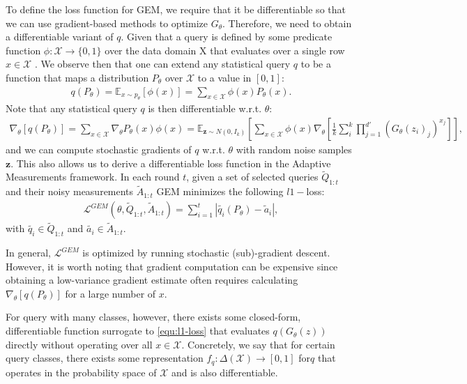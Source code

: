 To define the loss function for GEM, we require that it be differentiable so that we can use gradient-based methods to optimize $G_{\theta}$. Therefore, we need to obtain a differentiable variant of $q$. Given that a query is defined by some predicate function $\phi:\mathcal{X}\rightarrow \{0,1\}$ over the data domain X that evaluates over a single row $x \in \mathcal{X}$ . We observe then that one can extend any statistical query $q$ to be a function that maps a distribution $P_\theta$ over $\mathcal{X}$ to a value in $[0, 1]$:
\begin{align}
    \label{equ:qfunction}
    q(P_{\theta})=\mathbb{E}_{x\sim p_\theta}[\phi(x)]=\sum _{x\in\mathcal{X}}\phi(x)P_\theta(x).
\end{align}
Note that any statistical query $q$ is then differentiable w.r.t. $\theta$:
\begin{align*}
    \nabla_\theta[q(P_\theta)]=\sum_{x\in \mathcal{X}}\nabla_\theta P_\theta(x)\phi(x)=\mathbb{E}_{\textbf{z}\sim N(0,I_k)}\left [ \sum_{x\in \mathcal{X}}\phi(x)\nabla_\theta\left [ \frac{1}{k}\sum_{i}^{k}\prod_{j=1}^{d'}(G_\theta(z_i)_j)^{x_j}  \right ] \right ],
\end{align*}
and we can compute stochastic gradients of $q$ w.r.t. $\theta$ with random noise samples $\textbf{z}$. This also allows us to derive a differentiable loss function in the Adaptive Measurements framework. In each round $t$, given a set of selected queries $\tilde{Q}_{1:t}$ and their noisy measurements $\tilde{A}_{1:t}$ GEM minimizes the following $l1-$loss:
\begin{align}
    \label{equ:l1-loss}
    \mathcal{L}^{GEM}\left ( \theta,\tilde{Q}_{1:t}, \tilde{A}_{1:t}\right )=\sum_{i=1}^{t}\left | \tilde{q_i}(P_\theta)- \tilde{a}_{i}\right |,
\end{align}
with $\tilde{q_i}\in \tilde{Q}_{1:t}$ and $\tilde{a_i}\in \tilde{A}_{1:t}$.

In general, $\mathcal{L}^{GEM}$ is optimized by running stochastic (sub)-gradient descent. However, it is worth noting that gradient computation can be expensive since obtaining a low-variance gradient estimate often requires calculating $\nabla_\theta[q(P_\theta)]$ for a large number of $x$. 

For query with many classes, however, there exists some closed-form, differentiable function surrogate to \eqref{equ:l1-loss} that evaluates $q(G_\theta(z))$ directly without operating over all $x \in \mathcal{X}$. Concretely, we say that for certain query classes, there exists some representation $f_{q}:\Delta (\mathcal{X})\rightarrow [0,1]$ for$ q$ that operates in the probability space of $\mathcal{X}$ and is also differentiable.

